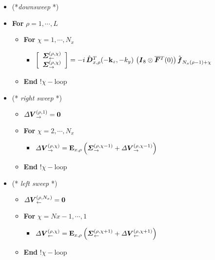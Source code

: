 \begin{figure}
{\begin{minipage} {140.0mm}
\begin{itemize}
\item  (*{\em downsweep\/ }*) 
\item {\bf  For} $\rho=1,\cdots,L$
\begin{itemize}
\item {\bf  For} $\chi=1,\cdots,N_x$
\begin{itemize}
\item $
\left[\begin{array}{c}
{\mbox{\boldmath$\mit \Sigma$\unboldmath}}^{(\rho,\chi)}_{\leftarrow}\\
{\mbox{\boldmath$\mit \Sigma$\unboldmath}}^{(\rho,\chi)}_{\rightarrow}
\end{array}\right]=-i\,
\hat{\mbox{\boldmath$\mit D$\unboldmath}}{}_{x,\rho}^{T}(-{\bf k}_{z},-{k}_{y})
\,\left({\mbox{\boldmath$\mit I$\unboldmath}}_8\otimes \overline{\mbox{\boldmath$\mit F$\unboldmath}}{}^{T}(0)  \right)
\hat{\mbox{\boldmath$\mit f$\unboldmath}}_{N_x(\rho-1)+\chi}
$
\end{itemize}
\item {\bf  End} !$\chi-$loop
\end{itemize}

\item (* {\em right sweep\/} *)

\begin{itemize}
\item $
{\mit \Delta} {\mbox{\boldmath$\mit V$\unboldmath}}_{\rightarrow }^{  
(\rho,1)}={\bf 0}$

\item {\bf  For} $\chi=2,\cdots,N_x$
\begin{itemize}
\item $
{\mit \Delta} {\mbox{\boldmath$\mit V$\unboldmath}}_{\rightarrow }^{(\rho,\chi)} ={\bf E}_{x,\rho}\left({{ \mbox{\boldmath$\mit \Sigma$\unboldmath}}_{ \rightarrow }^{(\rho,\chi-1)}+ {\mit \Delta} { \mbox{\boldmath$\mit V$\unboldmath}}_{\rightarrow 
}^{(\rho,\chi-1)}}
\right)
$
\end{itemize}
\item {\bf  End} !$\chi-$loop
\end{itemize}

\item (* {\em left sweep\/} *)
\begin{itemize}
\item $
{\mit \Delta} {\mbox{\boldmath$\mit V$\unboldmath}}_{\leftarrow }^{  
(\rho,N_x)}={\bf 0}$

\item {\bf  For} $\chi=Nx-1,\cdots,1$
\begin{itemize}
\item $
{\mit \Delta} { \mbox{\boldmath$\mit V$\unboldmath}}_{\leftarrow }^{(\rho,\chi)}  = {\bf E}_{x,\rho}\left({{ \mbox{\boldmath$\mit \Sigma$\unboldmath}}_{ \leftarrow }^{(\rho,\chi+1)}+ {\mit \Delta} {\mbox{\boldmath$\mit V$\unboldmath}}_{\leftarrow }^{  
(\rho,\chi+1)}}\right)
$
\end{itemize}
\item {\bf  End} !$\chi-$loop
\end{itemize}


\end{itemize}
\end{minipage}}
\end{figure}
